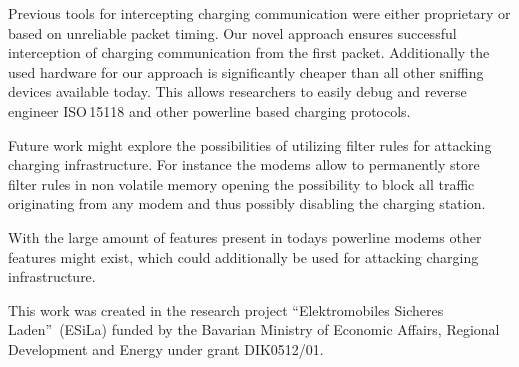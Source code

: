 \documentclass[sigconf]{acmart}
\begin{document}
Previous tools for intercepting charging communication were either proprietary or based on unreliable packet timing.
Our novel approach ensures successful interception of charging communication from the first packet.
Additionally the used hardware for our approach is significantly cheaper than all other sniffing devices available today.
This allows researchers to easily debug and reverse engineer ISO\,15118 and other powerline based charging protocols.

Future work might explore the possibilities of utilizing filter rules for attacking charging infrastructure.
For instance the modems allow to permanently store filter rules in non volatile memory opening the possibility to block all traffic originating from any modem and thus possibly disabling the charging station.

With the large amount of features present in todays powerline modems other features might exist, which could additionally be used for attacking charging infrastructure.

\begin{acks}
This work was created in the research project \textquotedblleft Elektromobiles Sicheres Laden\textquotedblright\ (ESiLa) funded by the Bavarian Ministry of Economic Affairs, Regional Development and Energy under grant DIK0512/01.
\end{acks}

\end{document}
